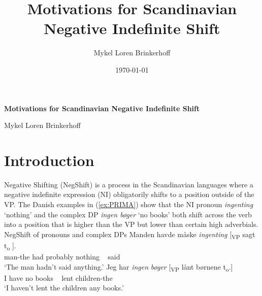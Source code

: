 \documentclass[12pt, letterpaper]{article}
\title{Motivations for Scandinavian Negative Indefinite Shift}
\author{Mykel Loren Brinkerhoff}
\date{\today}
\begin{document}
	
	
	\onehalfspacing
	
\begin{center}
	{\Large \textbf{Motivations for Scandinavian Negative Indefinite Shift}}
	\vspace{6pt}

	Mykel Loren Brinkerhoff
\end{center}


\section{Introduction} \label{sec:INTRO}
Negative Shifting (NegShift) is a process in the Scandinavian languages where a negative indefinite expression (NI) obligatorily shifts to a position outside of the VP. The Danish examples in (\ref{ex:PRIMA}) show that the NI pronoun \textit{ingenting} `nothing' and the complex DP \textit{ingen bøger} `no books' both shift across the verb into a position that is higher than the VP but lower than certain high adverbials. 
	\ea NegShift of pronouns and complex DPs\label{ex:PRIMA}
		\ea
		\gll Manden havde måske \textit{ingenting} [\textsubscript{VP} sagt t\textsubscript{o} ].\\
		man-the had probably nothing ~ said\\
		\glt `The man hadn't said anything.'
		\ex 
		\gll Jeg har \textit{ingen} \textit{bøger} [\textsubscript{VP} lånt børnene t\textsubscript{o}.]\\
		I have no books ~ lent children-the\\
		\glt `I haven't lent the children any books.'
		\z
	\z 
\end{document}
